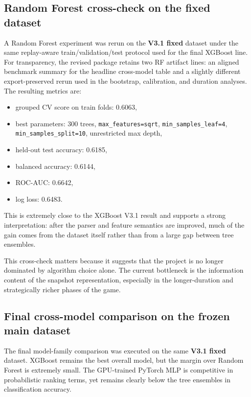 \documentclass[11pt,a4paper]{article}
\begin{document}
\subsection{Random Forest cross-check on the fixed dataset}
A Random Forest experiment was rerun on the \textbf{V3.1 fixed} dataset under the same replay-aware train/validation/test protocol used for the final XGBoost line. For transparency, the revised package retains two RF artifact lines: an aligned benchmark summary for the headline cross-model table and a slightly different export-preserved rerun used in the bootstrap, calibration, and duration analyses. The resulting metrics are:
\begin{itemize}
    \item grouped CV score on train folds: 0.6063,
    \item best parameters: 300 trees, \texttt{max\_features=sqrt}, \texttt{min\_samples\_leaf=4}, \texttt{min\_samples\_split=10}, unrestricted max depth,
    \item held-out test accuracy: 0.6185,
    \item balanced accuracy: 0.6144,
    \item ROC-AUC: 0.6642,
    \item log loss: 0.6483.
\end{itemize}
This is extremely close to the XGBoost V3.1 result and supports a strong interpretation: after the parser and feature semantics are improved, much of the gain comes from the dataset itself rather than from a large gap between tree ensembles.

This cross-check matters because it suggests that the project is no longer dominated by algorithm choice alone. The current bottleneck is the information content of the snapshot representation, especially in the longer-duration and strategically richer phases of the game.

\subsection{Final cross-model comparison on the frozen main dataset}
The final model-family comparison was executed on the same \textbf{V3.1 fixed} dataset. XGBoost remains the best overall model, but the margin over Random Forest is extremely small. The GPU-trained PyTorch MLP is competitive in probabilistic ranking terms, yet remains clearly below the tree ensembles in classification accuracy.
\end{document}
